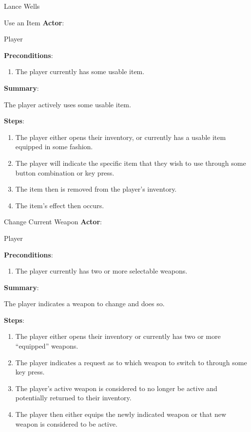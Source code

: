 \documentclass[12pt]{report}
\begin{document}
\begin{section}{Lance Wells}
\begin{subsection}{Use an Item}
\textbf{Actor}:

Player

\textbf{Preconditions}:

\begin{enumerate}
\item The player currently has some usable item.
\end{enumerate}

\textbf{Summary}:

The player actively uses some usable item.

\textbf{Steps}:

\begin{enumerate}
\item The player either opens their inventory, or currently has a usable
item equipped in some fashion.
\item The player will indicate the specific item that they wish to use
through some button combination or key press.
\item The item then is removed from the player's inventory.
\item The item's effect then occurs.
\end{enumerate}
\end{subsection}

\begin{subsection}{Change Current Weapon}
\textbf{Actor}:

Player

\textbf{Preconditions}:

\begin{enumerate}
\item The player currently has two or more selectable weapons.
\end{enumerate}

\textbf{Summary}:

The player indicates a weapon to change and does so.

\textbf{Steps}:

\begin{enumerate}
\item The player either opens their inventory or currently has two or more
``equipped'' weapons.
\item The player indicates a request as to which weapon to switch to through
some key press.
\item The player's active weapon is considered to no longer be active and
potentially returned to their inventory.
\item The player then either equips the newly indicated weapon or that new
weapon is considered to be active.
\end{enumerate}
\end{subsection}


\end{section}
\end{document}
